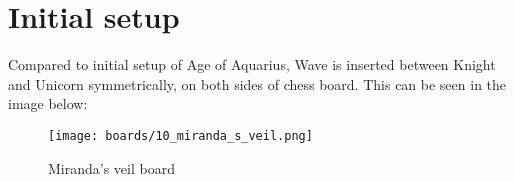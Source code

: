 \clearpage %

\section*{Initial setup}

Compared to initial setup of Age of Aquarius, Wave is inserted between Knight and Unicorn
symmetrically, on both sides of chess board. This can be seen in the image below:

\noindent
\begin{figure}[h]
\texttt{[image: boards/10\_miranda\_s\_veil.png]}
\caption{Miranda's veil board}
\label{fig:10_miranda_s_veil}
\end{figure}

\clearpage %
